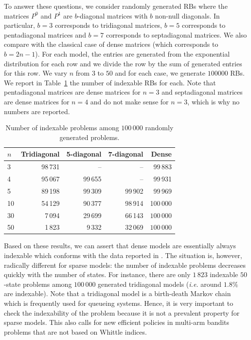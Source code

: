 \documentclass[acmsmall,screen,anonymous]{acmart}
\begin{document}
To answer these questions, we consider randomly generated RBs where the matrices $P^0$ and $P^1$ are $b$-diagonal matrices with $b$  non-null diagonals. In particular, $b=3$ corresponds to tridiagonal matrices, $b=5$ corresponds to pentadiagonal matrices and $b=7$ corresponds to septadiagonal matrices. We also compare with the classical case of dense matrices (which corresponds to $b=2n-1$).  For each model, the entries are generated from the exponential distribution for each row and we divide the row by the sum of generated entries for this row.   We vary $n$ from $3$ to $50$ and for each case, we generate $100000$ RBs. We report in Table~\ref{tb:number_indexable} the number of indexable RBs for each. Note that pentadiagonal matrices are dense matrices for $n=3$ and septadiagonal matrices are dense matrices for $n=4$ and do not make sense for $n=3$, which is why no numbers are reported.

\begin{table}[ht]
    \caption{Number of indexable problems among $100\,000$ randomly generated problems.}
    \label{tb:number_indexable}
    \begin{tabular}{|l|r|r|r|r|}
        \hline
        $n$ &  Tridiagonal &  5-diagonal &  7-diagonal &  Dense \\
        \hline
        3  &     98\,731 &        -- &        -- &   99\,883 \\
        4  &     95\,067 &     99\,655 &        -- &   99\,931 \\
        5  &     89\,198 &     99\,309 &     99\,902 &   99\,969 \\
        10 &     54\,129 &     90\,377 &     98\,914 &  100\,000 \\
        30 &      7\,094 &     29\,699 &     66\,143 &  $100\,000$ \\
        50 &      1\,823 &      9\,332 &     32\,069 &  $100\,000$ \\
        \hline
    \end{tabular}
\end{table}

Based on these results, we can assert that dense models are essentially always indexable which conforms with the data reported in \cite{nino2007dynamic}. The situation is, however, radically different for sparse models: the number of indexable problems decreases quickly with the number of states. For instance, there are only $1\,823$ indexable $50$-state problems among $100\,000$ generated tridiagonal models (\emph{i.e.} around $1.8\%$ are indexable). Note that a tridiagonal model is a birth-death Markov chain which is frequently used for queueing systems. Hence, it is very important to check the indexability of the problem because it is not a prevalent property for sparse models. This also calls for new efficient policies in multi-arm bandits problems that are not based on Whittle indices.
\end{document}
